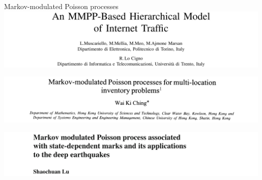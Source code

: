 \documentclass{beamer}
\begin{document}
\begin{frame}{Markov-modulated Poisson processes}
    \includegraphics[width=\textwidth]{muscariello2004mmpp}

    \includegraphics[width=\textwidth]{ching1997markov}

    \includegraphics[width=\textwidth]{lu2012markov}
\end{frame}

\newcommand{\ls}{\lambda_{\text{slow}}}
\newcommand{\lf}{\lambda_{\text{fast}}}
\end{document}
